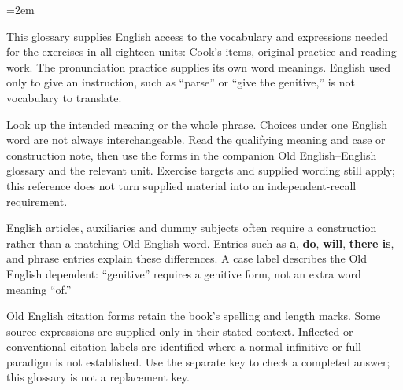 \newcommand{\runningtitle}{English–Old English}

\usepackage{multicol}
\raggedcolumns
\newcommand{\needspace}[1]{\par\begingroup\skip0=\lastskip\vskip-\skip0\dimen0=#1\relax\advance\dimen0 by\skip0\vskip0pt plus\dimen0\penalty-100\vskip0pt plus-\dimen0\vskip\dimen0\penalty9999\vskip-\dimen0\vskip\skip0\endgroup}
\setlength{\columnsep}{6mm}
\emergencystretch=2em

\raggedright
{}
This glossary supplies English access to the vocabulary and expressions needed for the exercises in all eighteen units: Cook's items, original practice and reading work. The pronunciation practice supplies its own word meanings. English used only to give an instruction, such as “parse” or “give the genitive,” is not vocabulary to translate.\par
Look up the intended meaning or the whole phrase. Choices under one English word are not always interchangeable. Read the qualifying meaning and case or construction note, then use the forms in the companion Old English–English glossary and the relevant unit. Exercise targets and supplied wording still apply; this reference does not turn supplied material into an independent-recall requirement.\par
English articles, auxiliaries and dummy subjects often require a construction rather than a matching Old English word. Entries such as \textbf{a}, \textbf{do}, \textbf{will}, \textbf{there is}, and phrase entries explain these differences. A case label describes the Old English dependent: “genitive” requires a genitive form, not an extra word meaning “of.”\par
Old English citation forms retain the book's spelling and length marks. Some source expressions are supplied only in their stated context. Inflected or conventional citation labels are identified where a normal infinitive or full paradigm is not established. Use the separate key to check a completed answer; this glossary is not a replacement key.\par
